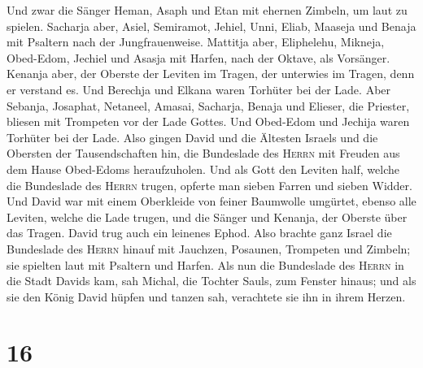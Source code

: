  Und zwar die Sänger Heman, Asaph und Etan mit ehernen
Zimbeln, um laut zu spielen.  Sacharja aber, Asiel,
Semiramot, Jehiel, Unni, Eliab, Maaseja und Benaja mit Psaltern nach der
Jungfrauenweise.  Mattitja aber, Eliphelehu, Mikneja,
Obed-Edom, Jechiel und Asasja mit Harfen, nach der Oktave, als
Vorsänger.  Kenanja aber, der Oberste der Leviten im
Tragen, der unterwies im Tragen, denn er verstand es. 
Und Berechja und Elkana waren Torhüter bei der Lade. 
Aber Sebanja, Josaphat, Netaneel, Amasai, Sacharja, Benaja und Elieser,
die Priester, bliesen mit Trompeten vor der Lade Gottes. Und Obed-Edom
und Jechija waren Torhüter bei der Lade.  Also gingen
David und die Ältesten Israels und die Obersten der Tausendschaften hin,
die Bundeslade des \textsc{Herrn} mit Freuden aus dem Hause Obed-Edoms
heraufzuholen.  Und als Gott den Leviten half, welche die
Bundeslade des \textsc{Herrn} trugen, opferte man sieben Farren und
sieben Widder.  Und David war mit einem Oberkleide von
feiner Baumwolle umgürtet, ebenso alle Leviten, welche die Lade trugen,
und die Sänger und Kenanja, der Oberste über das Tragen. David trug auch
ein leinenes Ephod.  Also brachte ganz Israel die
Bundeslade des \textsc{Herrn} hinauf mit Jauchzen, Posaunen, Trompeten
und Zimbeln; sie spielten laut mit Psaltern und Harfen. 
Als nun die Bundeslade des \textsc{Herrn} in die Stadt Davids kam, sah
Michal, die Tochter Sauls, zum Fenster hinaus; und als sie den König
David hüpfen und tanzen sah, verachtete sie ihn in ihrem Herzen.

\hypertarget{section-15}{%
\section{16}\label{section-15}}

